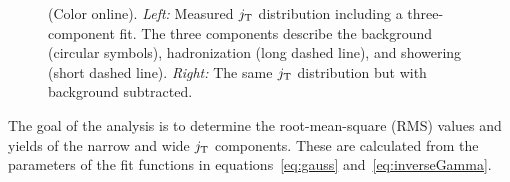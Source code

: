   \begin{figure}
    \begin{center}
    \end{center}
    \caption{(Color online). \emph{Left:} Measured $j_{\rm T}$ distribution including a three-component fit. The three components describe the background (circular symbols), hadronization (long dashed line), and showering (short dashed line). \emph{Right:} The same $j_{\rm T}$ distribution but with background subtracted.}
    \label{fig:jtdistribution}
  \end{figure}

The goal of the analysis is to determine the root-mean-square (RMS) values and yields of the narrow and wide $j_{\rm T}$ components. These are calculated from the parameters of the fit functions in equations~\eqref{eq:gauss} and~\eqref{eq:inverseGamma}.

